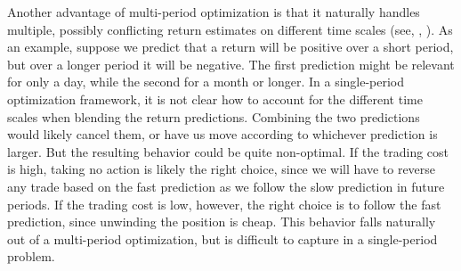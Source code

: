 \documentclass[openany]{article}  %
\begin{document}
Another advantage of multi-period optimization is that it naturally
handles multiple, possibly conflicting return estimates on different
time scales (see, \eg, \cite{garleanu2013dynamic, nystrup2016dynamic}).
As an example, suppose we predict that a return will be positive
over a short period, but over a longer period it will be negative.
The first prediction might be relevant for only a day, while the second
for a month or longer.
In a single-period optimization framework, it is not clear how to account
for the different time scales when blending the return predictions.
Combining the two predictions would likely cancel them, or have us move
according to whichever prediction is larger.
But the resulting behavior could be quite non-optimal.
If the trading cost is high, taking no action is likely
the right choice, since we will have to reverse any trade based on
the fast prediction as we follow the slow prediction in future periods.
If the trading cost is low, however, the right choice is to
follow the fast prediction, since unwinding the position is cheap.
This behavior falls naturally out of a multi-period optimization,
but is difficult to capture in a single-period problem.
\end{document}
